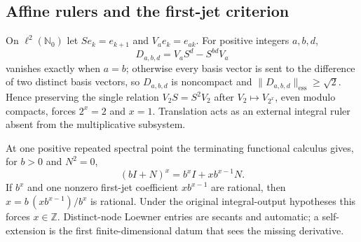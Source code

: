 \documentclass[11pt,oneside]{article}
\theoremstyle{definition}
\theoremstyle{remark}
\newcommand{\Nzero}{\mathbb N_0}
\newcommand{\Z}{\mathbb Z}
\begin{document}
\subsection{Affine rulers and the first-jet criterion}
\label{opcoh:affine-jet}

On $\ell^2(\Nzero)$ let $Se_k=e_{k+1}$ and $V_a e_k=e_{ak}$.  For positive integers
$a,b,d$,
\begin{equation}
 D_{a,b,d}=V_aS^d-S^{bd}V_a
\end{equation}
vanishes exactly when $a=b$; otherwise every basis vector is sent to the difference of two
distinct basis vectors, so $D_{a,b,d}$ is noncompact and
$\|D_{a,b,d}\|_{\mathrm{ess}}\ge\sqrt2$.  Hence preserving the single relation
$V_2S=S^2V_2$ after $V_2\mapsto V_{2^x}$, even modulo compacts, forces $2^x=2$ and $x=1$.
Translation acts as an external integral ruler absent from the multiplicative subsystem.

At one positive repeated spectral point the terminating functional calculus gives, for
$b>0$ and $N^2=0$,
\begin{equation}
 (bI+N)^x=b^xI+xb^{x-1}N.
 \label{opcoh:eq-jordan}
\end{equation}
If $b^x$ and one nonzero first-jet coefficient $xb^{x-1}$ are rational, then
$x=b\,(xb^{x-1})/b^x$ is rational.  Under the original integral-output hypotheses this
forces $x\in\Z$.  Distinct-node Loewner entries are secants and automatic; a self-extension
is the first finite-dimensional datum that sees the missing derivative.
\end{document}
